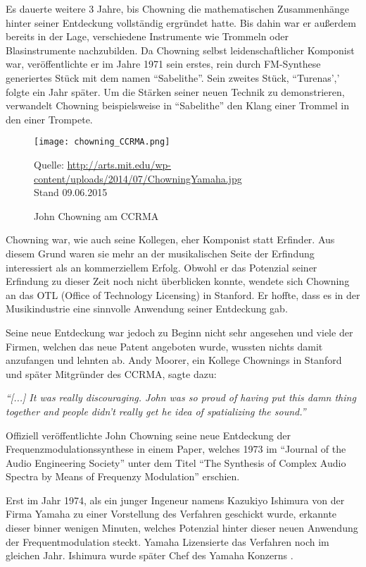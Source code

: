 Es dauerte weitere 3 Jahre, bis Chowning die mathematischen Zusammenhänge hinter seiner Entdeckung vollständig ergründet hatte. Bis dahin war er außerdem bereits in der Lage, verschiedene Instrumente wie Trommeln oder Blasinstrumente nachzubilden. Da Chowning selbst leidenschaftlicher Komponist war, veröffentlichte er im Jahre 1971 sein erstes, rein durch FM-Synthese generiertes Stück mit dem namen ``Sabelithe''. Sein zweites Stück, ``Turenas',' folgte ein Jahr später.
Um die Stärken seiner neuen Technik zu demonstrieren, verwandelt Chowning beispielsweise in ``Sabelithe'' den Klang einer Trommel in den einer Trompete.\cite[S. 39]{soundofinnovation}
 
\begin{figure} [ht]
\centering
  \texttt{[image: chowning\_CCRMA.png]}
\caption{John Chowning am CCRMA}
\label{fig:chowningdx7}
Quelle: \url{ http://arts.mit.edu/wp-content/uploads/2014/07/ChowningYamaha.jpg} \\Stand 09.06.2015
\end{figure}
 
Chowning war, wie auch seine Kollegen, eher Komponist statt Erfinder. Aus diesem Grund waren sie mehr an der musikalischen Seite der Erfindung interessiert als an kommerziellem Erfolg. Obwohl er das Potenzial seiner Erfindung zu dieser Zeit noch nicht überblicken konnte, wendete sich Chowning an das OTL (Office of Technology Licensing) in Stanford. Er hoffte, dass es in der Musikindustrie eine sinnvolle Anwendung seiner Entdeckung gab.\cite[S. 42]{soundofinnovation}

 Seine neue Entdeckung war jedoch zu Beginn nicht sehr angesehen und viele der Firmen, welchen das neue Patent angeboten wurde, wussten nichts damit anzufangen und lehnten ab. Andy Moorer, ein Kollege Chownings in Stanford und später Mitgründer des CCRMA, sagte dazu: 

\textit{``[...] It was really discouraging. John was so proud of having put this damn thing together and people didn't really get he idea of spatializing the sound.''}\cite[S. 43]{soundofinnovation}

Offiziell veröffentlichte John Chowning seine neue Entdeckung der Frequenzmodulationssynthese in einem Paper, welches 1973 im ``Journal of the Audio Engineering Society'' unter dem Titel ``The Synthesis of Complex Audio Spectra by Means of Frequenzy Modulation'' erschien.

Erst im Jahr 1974, als ein junger Ingeneur namens Kazukiyo Ishimura von der Firma Yamaha zu einer Vorstellung des Verfahren geschickt wurde, erkannte dieser binner wenigen Minuten, welches Potenzial hinter dieser neuen Anwendung der Frequentmodulation steckt. Yamaha Lizensierte das Verfahren noch im gleichen Jahr. Ishimura wurde später Chef des Yamaha Konzerns \cite{fatherofdigitalmusik}.

